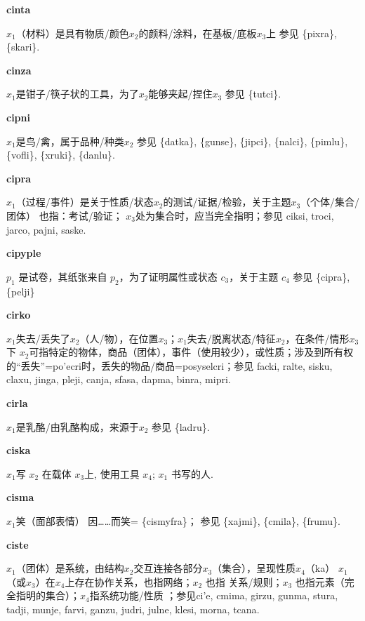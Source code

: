 \documentclass[notitlepage,twocolumn,a4paper,10pt]{book}
\begin{document}
{\sffamily\bfseries cinta} $x_1$（材料）是具有物质\slash{}颜色$x_2$的颜料\slash{}涂料，在基板\slash{}底板$x_3$上 \textemdash{} 参见 \{pixra\}, \{skari\}.

{\sffamily\bfseries cinza} $x_1$是钳子\slash{}筷子状的工具，为了$x_2$能够夹起\slash{}捏住$x_3$ \textemdash{} 参见 \{tutci\}.

{\sffamily\bfseries cipni}\enspace {\ttfamily\bfseries[    cpi]}  $x_1$是鸟\slash{}禽，属于品种\slash{}种类$x_2$ \textemdash{} 参见 \{datka\}, \{gunse\}, \{jipci\}, \{nalci\}, \{pimlu\}, \{vofli\}, \{xruki\}, \{danlu\}.

{\sffamily\bfseries cipra}\enspace {\ttfamily\bfseries[cip]}  $x_1$（过程\slash{}事件）是关于性质\slash{}状态$x_2$的测试\slash{}证据\slash{}检验，关于主题$x_3$（个体\slash{}集合\slash{}团体） \textemdash{} 也指：考试\slash{}验证； $x_3$处为集合时，应当完全指明；参见 {ciksi}, {troci}, {jarco}, {pajni}, {saske}.

{\sffamily\bfseries cipyple} $p_1$ 是试卷，其纸张来自 $p_2$，为了证明属性或状态 $c_3$，关于主题 $c_4$ \textemdash{} 参见 \{cipra\}, \{pelji\}

{\sffamily\bfseries cirko}\enspace {\ttfamily\bfseries[    cri]}  $x_1$失去\slash{}丢失了$x_2$（人\slash{}物），在位置$x_3$；$x_1$失去\slash{}脱离状态\slash{}特征$x_2$，在条件\slash{}情形$x_3$下 \textemdash{} $x_2$可指特定的物体，商品（团体），事件（使用较少），或性质；涉及到所有权的“丢失”={po'ecri}时，丢失的物品\slash{}商品={posyselcri}；参见 {facki}, {ralte}, {sisku}, {claxu}, {jinga}, {pleji}, {canja}, {sfasa}, {dapma}, {binra}, {mipri}.

{\sffamily\bfseries cirla} $x_1$是乳酪\slash{}由乳酪构成，来源于$x_2$ \textemdash{} 参见 \{ladru\}.

{\sffamily\bfseries ciska}\enspace {\ttfamily\bfseries[        ci'a]}  $x_1$写 $x_2$ 在载体 $x_3$上, 使用工具 $x_4$; $x_1$ 书写的人.

{\sffamily\bfseries cisma} $x_1$笑（面部表情） \textemdash{} 因……而笑= \{cismyfra\}； 参见 \{xajmi\}, \{cmila\}, \{frumu\}.

{\sffamily\bfseries ciste}\enspace {\ttfamily\bfseries[        ci'e]}  $x_1$（团体）是系统，由结构$x_2$交互连接各部分$x_3$（集合），呈现性质$x_4$（ka） \textemdash{} $x_1$（或$x_3$）在$x_4$上存在协作关系，也指网络；$x_2$ 也指 关系\slash{}规则；$x_3$ 也指元素（完全指明的集合）；$x_4$指系统功能\slash{}性质 ；参见{ci'e}, {cmima}, {girzu}, {gunma}, {stura}, {tadji}, {munje}, {farvi}, {ganzu}, {judri}, {julne}, {klesi}, {morna}, {tcana}.
\end{document}

